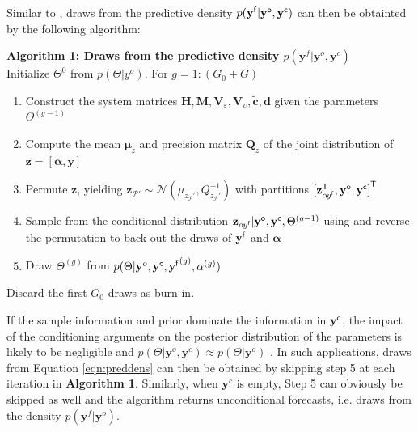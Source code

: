 \documentclass[notitlepage,a4paper,12pt]{article}
\newcommand{\transpose}[1]{{#1}^{\sf{T}}}
\begin{document}
Similar to \cite[][Algorithm 1]{waggonerzha1999_res}, draws from the predictive density $p(\mathbf{y^{\sf{f}}}|\mathbf{y^{\sf{o}}}, \mathbf{y^{\sf{c}}})$ can then be obtainted by the following algorithm:\\

\hfill\begin{minipage}{\dimexpr\textwidth-1cm}
    \noindent\textbf{Algorithm 1: Draws from the predictive density $p(\mathbf{y}^f | \mathbf{y}^o, \mathbf{y}^c)$}\\

    Initialize $\Theta^{0}$ from $p(\Theta | y^o)$. For $g=1:(G_0+G)$
    
    \begin{enumerate}    
        \item Construct the system matrices $\mathbf{H}, \mathbf{M}, \mathbf{V}_{\!\varepsilon}, \mathbf{V}_{\!\upsilon}, \tilde{\mathbf{c}}, \mathbf{d}$ given the parameters $\Theta^{(g-1)}$
        \item Compute the mean $\boldsymbol{\mu}_{z}$ and precision matrix $\mathbf{Q}_{z}$ of the joint distribution of $\mathbf{z} = [\boldsymbol{\alpha}, \mathbf{y}]$  
        \item Permute $\mathbf{z}$, yielding $\mathbf{z}_{\mathcal{P}'} \sim \mathcal{N}(\mu_{z_\mathcal{P}'}, Q_{z_\mathcal{P}'}^{-1})$ with partitions $\transpose{[\mathbf{z}^{\sf{T}}_{\alpha\! y^{\sf{f}}}, \mathbf{y}^{\sf{o}}, \mathbf{y}^{\sf{c}}]}$
        \item Sample from the conditional distribution $\mathbf{z}_{\alpha\! y^{\sf{f}}} | \mathbf{y}^{\sf{o}}, \mathbf{y}^{\sf{c}}, \Theta^{(g-1)}$ using \citep[][Algorithm 2.1 and 2.4]{rueheld_2005} and reverse the permutation to back out the draws of $\mathbf{y}^{\sf{f}}$ and $\boldsymbol{\alpha}$
        \item Draw $\Theta^{(g)}$ from $p(\Theta|\mathbf{y}^o, \mathbf{y}^{\sf{c}}, {\mathbf{y}^{\sf{f}}}^{(g)}, \alpha^{(g)})$ 
     \end{enumerate}
    
    Discard the first $G_0$ draws as burn-in.\\


    \xdef\tpd{\the\prevdepth}
\end{minipage}

If the sample information and prior dominate the information in $\mathbf{y}^{\sf{c}}$, the impact of the conditioning arguments on the posterior distribution of the parameters is likely to be negligible and $p(\Theta | \mathbf{y}^o, \mathbf{y}^c) \approx p(\Theta | \mathbf{y}^o)$ \citep{delnegro_schorfheide_2013_hb,bgl_2015ijf}. In such applications, draws from Equation \ref{eqn:preddens} can then be obtained by skipping step 5 at each iteration in \textbf{Algorithm 1}. Similarly, when $\mathbf{y}^c$ is empty, Step 5 can obviously be skipped as well and the algorithm returns unconditional forecasts, i.e. draws from the density $p(\mathbf{y}^f | \mathbf{y}^o)$.
\end{document}

